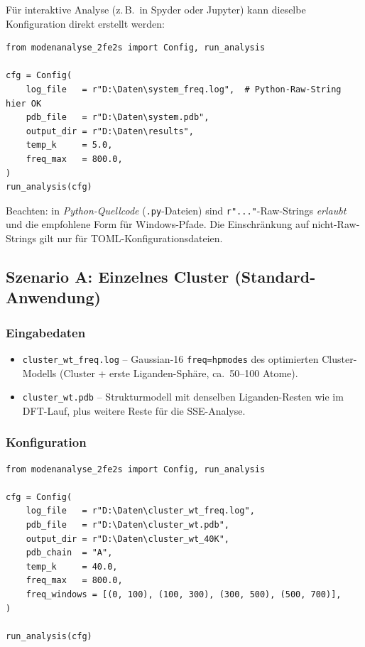 \documentclass[11pt,a4paper,twoside]{article}
\theoremstyle{remark}
\begin{document}
F\"ur interaktive Analyse (z.\,B.\ in Spyder oder Jupyter) kann
dieselbe Konfiguration direkt erstellt werden:

\begin{lstlisting}[style=python]
from modenanalyse_2fe2s import Config, run_analysis

cfg = Config(
    log_file   = r"D:\Daten\system_freq.log",  # Python-Raw-String hier OK
    pdb_file   = r"D:\Daten\system.pdb",
    output_dir = r"D:\Daten\results",
    temp_k     = 5.0,
    freq_max   = 800.0,
)
run_analysis(cfg)
\end{lstlisting}

Beachten: in \emph{Python-Quellcode} (\texttt{.py}-Dateien) sind
\texttt{r"..."}-Raw-Strings \emph{erlaubt} und die empfohlene Form
f\"ur Windows-Pfade. Die Einschr\"ankung auf nicht-Raw-Strings gilt
nur f\"ur TOML-Konfigurationsdateien.

\subsection{Szenario A: Einzelnes Cluster (Standard-Anwendung)}
\label{sec:workflow-single}

\subsubsection*{Eingabedaten}

\begin{itemize}
  \item \texttt{cluster\_wt\_freq.log} -- Gaussian-16 \texttt{freq=hpmodes}
        des optimierten Cluster-Modells (Cluster + erste Liganden-Sph\"are,
        ca.\ 50--100 Atome).
  \item \texttt{cluster\_wt.pdb} -- Strukturmodell mit denselben
        Liganden-Resten wie im DFT-Lauf, plus weitere Reste f\"ur
        die SSE-Analyse.
\end{itemize}

\subsubsection*{Konfiguration}

\begin{lstlisting}[style=python]
from modenanalyse_2fe2s import Config, run_analysis

cfg = Config(
    log_file   = r"D:\Daten\cluster_wt_freq.log",
    pdb_file   = r"D:\Daten\cluster_wt.pdb",
    output_dir = r"D:\Daten\cluster_wt_40K",
    pdb_chain  = "A",
    temp_k     = 40.0,
    freq_max   = 800.0,
    freq_windows = [(0, 100), (100, 300), (300, 500), (500, 700)],
)

run_analysis(cfg)
\end{lstlisting}
\end{document}

